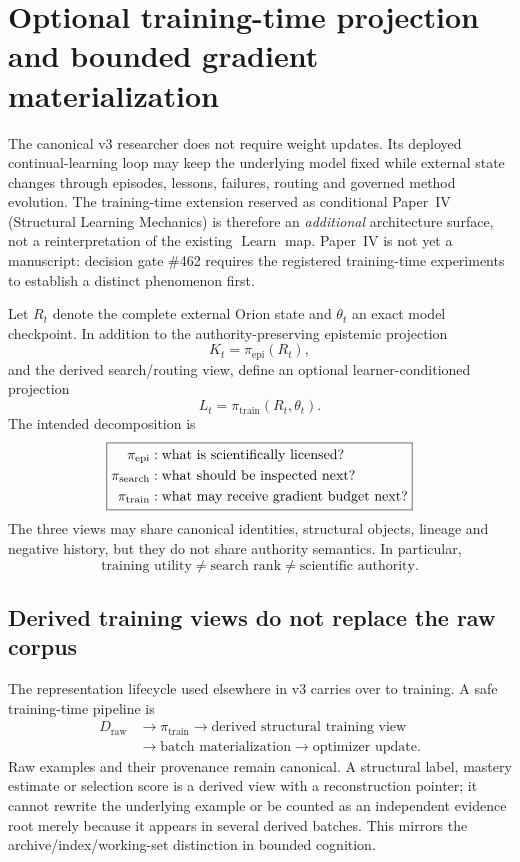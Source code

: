 \section{Optional training-time projection and bounded gradient materialization}
\label{sec:training-time-projection}

The canonical v3 researcher does not require weight updates.  Its deployed continual-learning loop may keep the underlying model fixed while external state changes through episodes, lessons, failures, routing and governed method evolution.  The training-time extension reserved as conditional Paper~IV (Structural Learning Mechanics) is therefore an \emph{additional} architecture surface, not a reinterpretation of the existing $\operatorname{Learn}$ map.  Paper~IV is not yet a manuscript: decision gate \#462 requires the registered training-time experiments to establish a distinct phenomenon first.

Let $R_t$ denote the complete external Orion state and $\theta_t$ an exact model checkpoint.  In addition to the authority-preserving epistemic projection
\[
K_t=\pi_{\mathrm{epi}}(R_t),
\]
and the derived search/routing view, define an optional learner-conditioned projection
\[
L_t=\pi_{\mathrm{train}}(R_t,\theta_t).
\]
The intended decomposition is
\[
\boxed{%
\begin{aligned}
\pi_{\mathrm{epi}} &: \text{what is scientifically licensed?}\\
\pi_{\mathrm{search}} &: \text{what should be inspected next?}\\
\pi_{\mathrm{train}} &: \text{what may receive gradient budget next?}
\end{aligned}}
\]
The three views may share canonical identities, structural objects, lineage and negative history, but they do not share authority semantics.  In particular,
\[
\text{training utility}\neq\text{search rank}\neq\text{scientific authority}.
\]

\subsection{Derived training views do not replace the raw corpus}

The representation lifecycle used elsewhere in v3 carries over to training.  A safe training-time pipeline is
\[
\begin{aligned}
D_{\mathrm{raw}}
&\longrightarrow \pi_{\mathrm{train}}
\longrightarrow \text{derived structural training view} \\
&\longrightarrow \text{batch materialization}
\longrightarrow \text{optimizer update}.
\end{aligned}
\]
Raw examples and their provenance remain canonical.  A structural label, mastery estimate or selection score is a derived view with a reconstruction pointer; it cannot rewrite the underlying example or be counted as an independent evidence root merely because it appears in several derived batches.  This mirrors the archive/index/working-set distinction in bounded cognition.


